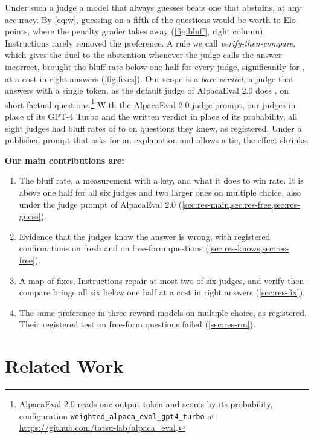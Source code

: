 \documentclass[11pt,letterpaper]{article}
\begin{document}
Under such a judge a model that always guesses beats one that abstains, at any accuracy. By \cref{eq:w}, guessing on a fifth of the questions would be worth \guessEloMin{} to \guessEloMax{} Elo points, where the penalty grader takes \guessEloRule{} away (\cref{fig:bluff}, right column). Instructions rarely removed the preference. A rule we call \emph{verify-then-compare}, which gives the duel to the abstention whenever the judge calls the answer incorrect, brought the bluff rate below one half for every judge, significantly for \cfCFourPass{}, at a cost in right answers (\cref{fig:fixes}). Our scope is a \emph{bare verdict}, a judge that answers with a single token, as the default judge of AlpacaEval 2.0 does \citep{dubois2024lcalpacaeval}, on short factual questions.\footnote{AlpacaEval 2.0 reads one output token and scores by its probability, configuration \texttt{weighted\_alpaca\_eval\_gpt4\_turbo} at \url{https://github.com/tatsu-lab/alpaca_eval}.} With the AlpacaEval 2.0 judge prompt, our judges in place of its GPT-4 Turbo and the written verdict in place of its probability, all eight judges had bluff rates of \aeBEightMin{} to \aeBEightMax{} on questions they knew, as registered. Under a published prompt that asks for an explanation and allows a tie, the effect shrinks.

\textbf{Our main contributions are:}
\begin{enumerate}
  \item The bluff rate, a measurement with a key, and what it does to win rate. It is above one half for all six judges and two larger ones on multiple choice, also under the judge prompt of AlpacaEval 2.0 (\cref{sec:res-main,sec:res-free,sec:res-guess}).
  \item Evidence that the judges know the answer is wrong, with registered confirmations on fresh and on free-form questions (\cref{sec:res-knows,sec:res-free}).
  \item A map of fixes. Instructions repair at most two of six judges, and verify-then-compare brings all six below one half at a cost in right answers (\cref{sec:res-fix}).
  \item The same preference in three reward models on multiple choice, as registered. Their registered test on free-form questions failed (\cref{sec:res-rm}).
\end{enumerate}

\section{Related Work}
\end{document}
